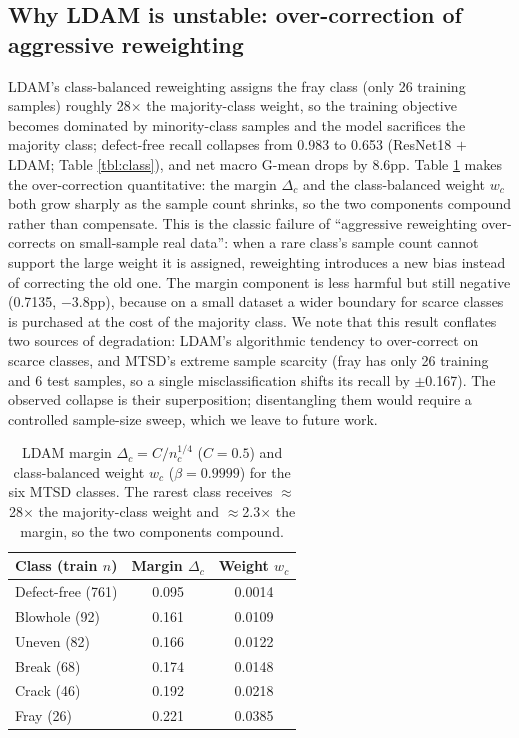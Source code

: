 \documentclass[a4paper,fleqn]{cas-sc}
\begin{document}
\begin{sloppypar}
	\subsection{Why LDAM is unstable: over-correction of aggressive reweighting}
	\par{
		LDAM's class-balanced reweighting assigns the fray class (only 26 training samples) roughly 28$\times$ the majority-class weight, so the training objective becomes dominated by minority-class samples and the model sacrifices the majority class; defect-free recall collapses from 0.983 to 0.653 (ResNet18 $+$ LDAM; Table \ref{tbl:class}), and net macro G-mean drops by 8.6pp. Table \ref{tbl:ldamw} makes the over-correction quantitative: the margin $\Delta_c$ and the class-balanced weight $w_c$ both grow sharply as the sample count shrinks, so the two components compound rather than compensate. This is the classic failure of ``aggressive reweighting over-corrects on small-sample real data'': when a rare class's sample count cannot support the large weight it is assigned, reweighting introduces a new bias instead of correcting the old one. The margin component is less harmful but still negative (0.7135, $-$3.8pp), because on a small dataset a wider boundary for scarce classes is purchased at the cost of the majority class. We note that this result conflates two sources of degradation: LDAM's algorithmic tendency to over-correct on scarce classes, and MTSD's extreme sample scarcity (fray has only 26 training and 6 test samples, so a single misclassification shifts its recall by $\pm$0.167). The observed collapse is their superposition; disentangling them would require a controlled sample-size sweep, which we leave to future work.
	}

	\begin{table}[pos=htbp]
		\footnotesize
		\caption{LDAM margin $\Delta_c=C/n_c^{1/4}$ ($C{=}0.5$) and class-balanced weight $w_c$ ($\beta{=}0.9999$) for the six MTSD classes. The rarest class receives $\approx$28$\times$ the majority-class weight and $\approx$2.3$\times$ the margin, so the two components compound.}
		\label{tbl:ldamw}
		\centering
		\begin{tabular}{lcc}
			\hline
			\textbf{Class (train $n$)} & \textbf{Margin $\Delta_c$} & \textbf{Weight $w_c$} \\ \hline
			Defect-free (761) & 0.095 & 0.0014 \\
			Blowhole (92) & 0.161 & 0.0109 \\
			Uneven (82) & 0.166 & 0.0122 \\
			Break (68) & 0.174 & 0.0148 \\
			Crack (46) & 0.192 & 0.0218 \\
			Fray (26) & 0.221 & 0.0385 \\ \hline
		\end{tabular}
	\end{table}


\end{sloppypar}
\end{document}

